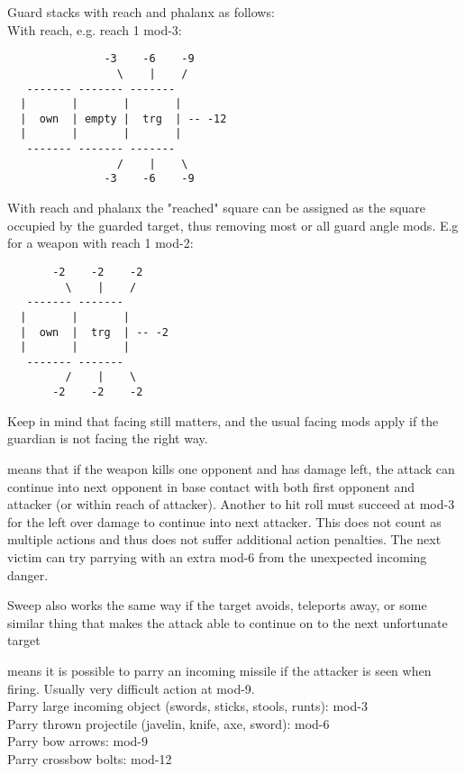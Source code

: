 Guard stacks with reach and phalanx as follows:\\
With reach, e.g. reach 1 mod-3:
\begin{samepage} \small \begin{verbatim}
               -3    -6    -9
                 \    |    /
   ------- ------- -------
  |       |       |       |
  |  own  | empty |  trg  | -- -12
  |       |       |       |
   ------- ------- -------
                 /    |    \
               -3    -6    -9
\end{verbatim} \normalsize \end{samepage}

With reach and phalanx the "reached" square can be assigned as the square occupied by the guarded target, thus removing most or all guard angle mods. E.g for a weapon with reach 1 mod-2:
\begin{samepage} \small \begin{verbatim}
       -2    -2    -2
         \    |    /
   ------- -------
  |       |       |
  |  own  |  trg  | -- -2
  |       |       |
   ------- -------
         /    |    \
       -2    -2    -2
\end{verbatim} \normalsize \end{samepage}

Keep in mind that facing still matters, and the usual facing mods apply if the guardian is not facing the right way.


 means that if the weapon kills one opponent and has damage left, the attack can continue into next opponent in base contact with both first opponent and attacker (or within reach of attacker). Another to hit roll must succeed at mod-3 for the left over damage to continue into next attacker. This does not count as multiple actions and thus does not suffer additional action penalties. The next victim can try parrying with an extra mod-6 from the unexpected incoming danger.

Sweep also works the same way if the target avoids, teleports away, or some similar thing that makes the attack able to continue on to the next unfortunate target


 means it is possible to parry an incoming missile if the attacker is seen when firing. Usually very difficult action at mod-9. \\
Parry large incoming object (swords, sticks, stools, runts): mod-3 \\
Parry thrown projectile (javelin, knife, axe, sword): mod-6 \\
Parry bow arrows: mod-9 \\
Parry crossbow bolts: mod-12

